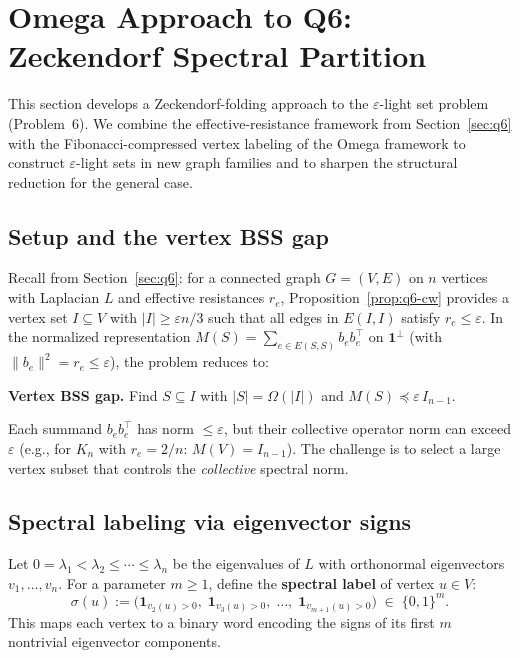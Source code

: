 \section{Omega Approach to Q6: Zeckendorf Spectral Partition}\label{sec:omega-q6}

This section develops a Zeckendorf-folding approach to the
$\varepsilon$-light set problem (Problem~6).
We combine the effective-resistance framework from Section~\ref{sec:q6}
with the Fibonacci-compressed vertex labeling of the Omega framework
to construct $\varepsilon$-light sets in new graph families and
to sharpen the structural reduction for the general case.

\subsection{Setup and the vertex BSS gap}

Recall from Section~\ref{sec:q6}: for a connected graph $G=(V,E)$
on $n$ vertices with Laplacian $L$ and effective resistances $r_e$,
Proposition~\ref{prop:q6-cw} provides a vertex set $I\subseteq V$
with $|I|\ge\varepsilon n/3$ such that all edges in $E(I,I)$ satisfy
$r_e\le\varepsilon$.  In the normalized representation
$M(S)=\sum_{e\in E(S,S)}b_eb_e^\top$ on $\mathbf{1}^\perp$
(with $\|b_e\|^2=r_e\le\varepsilon$), the problem reduces to:

\smallskip\noindent
\textbf{Vertex BSS gap.}
Find $S\subseteq I$ with $|S|=\Omega(|I|)$ and
$M(S)\preceq\varepsilon\,I_{n-1}$.
\smallskip

Each summand $b_eb_e^\top$ has norm $\le\varepsilon$, but their
collective operator norm can exceed $\varepsilon$ (e.g., for $K_n$
with $r_e=2/n$: $M(V)=I_{n-1}$).
The challenge is to select a large vertex subset that controls
the \emph{collective} spectral norm.


\subsection{Spectral labeling via eigenvector signs}

Let $0=\lambda_1<\lambda_2\le\cdots\le\lambda_n$ be the eigenvalues
of $L$ with orthonormal eigenvectors $v_1,\dots,v_n$.
For a parameter $m\ge 1$, define the \textbf{spectral label}
of vertex $u\in V$:
\[
\sigma(u) := \bigl(\mathbf{1}_{v_2(u)>0},\;
\mathbf{1}_{v_3(u)>0},\;\dots,\;
\mathbf{1}_{v_{m+1}(u)>0}\bigr)
\;\in\; \{0,1\}^m.
\]
This maps each vertex to a binary word encoding the signs of its
first $m$ nontrivial eigenvector components.

